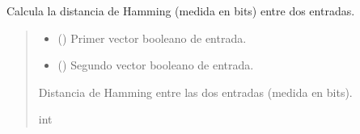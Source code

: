 \documentclass[letterpaper,10pt,english]{sphinxmanual}
\begin{document}
\begin{fulllineitems}
\label{\detokenize{utils.bool:utils.bool.hamming}}
\pysigstartsignatures
{}
\pysigstopsignatures
\sphinxAtStartPar
Calcula la distancia de Hamming (medida en bits) entre dos entradas.
\begin{quote}\begin{description}
\begin{itemize}
\item {} 
\sphinxAtStartPar
{} () \textendash{} Primer vector booleano de entrada.

\item {} 
\sphinxAtStartPar
{} () \textendash{} Segundo vector booleano de entrada.

\end{itemize}

\sphinxAtStartPar
Distancia de Hamming entre las dos entradas (medida en bits).

\sphinxAtStartPar
int

\end{description}\end{quote}

\end{fulllineitems}

\end{document}
